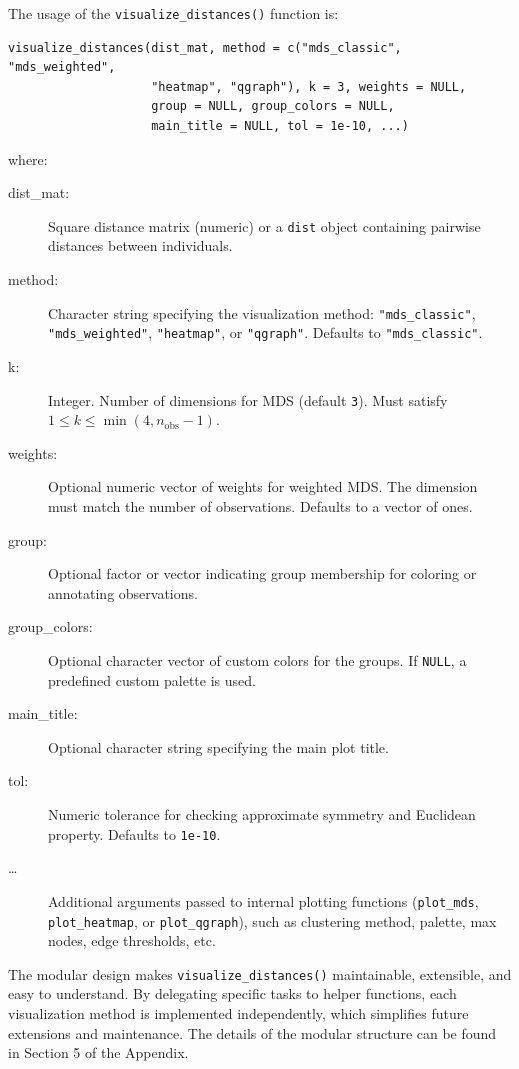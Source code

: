 The usage of the \texttt{visualize\_distances()} function is:

\begin{verbatim}
visualize_distances(dist_mat, method = c("mds_classic", "mds_weighted", 
                    "heatmap", "qgraph"), k = 3, weights = NULL, 
                    group = NULL, group_colors = NULL,
                    main_title = NULL, tol = 1e-10, ...)

\end{verbatim}
where:
\begin{description}
\item[dist\_mat:] Square distance matrix (numeric) or a \texttt{dist} object containing pairwise
distances between individuals.
\item[method:] Character string specifying the visualization method: \texttt{"mds\_classic"}, \texttt{"mds\_weighted"}, \texttt{"heatmap"}, or \texttt{"qgraph"}. Defaults to \texttt{"mds\_classic"}.
\item[k:] Integer. Number of dimensions for MDS (default \texttt{3}). Must satisfy $1 \le k \le \min(4, n_{\text{obs}}-1)$.
\item[weights:] Optional numeric vector of weights for weighted MDS. The dimension must match the number
of observations. Defaults to a vector of ones.
\item[group:] Optional factor or vector indicating group membership for coloring or annotating
observations.
\item[group\_colors:] Optional character vector of custom colors for the groups. If \texttt{NULL}, a predefined custom palette is used.
\item[main\_title:] Optional character string specifying the main plot title.
\item[tol:] Numeric tolerance for checking approximate symmetry and Euclidean property. Defaults to  \texttt{1e-10}.
\item[\ldots] Additional arguments passed to internal plotting functions (\texttt{plot\_mds}, \texttt{plot\_heatmap}, or \texttt{plot\_qgraph}), such as clustering method, palette, max nodes, edge thresholds, etc.
\end{description}

The modular design makes \texttt{visualize\_distances()} maintainable, extensible, and easy to understand. By delegating specific tasks to helper functions, each visualization method is implemented independently, which simplifies future extensions and maintenance. The details of the modular structure can be found in Section 5
of the Appendix.

